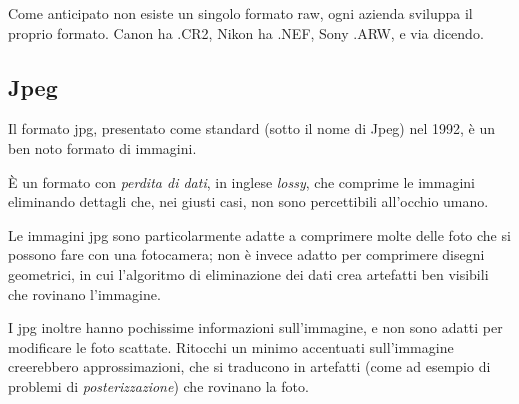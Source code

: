 Come anticipato non esiste un singolo formato raw, ogni azienda sviluppa il proprio formato. Canon ha .CR2, Nikon ha .NEF, Sony .ARW, e via dicendo.


\subsection{Jpeg} \label{subsec:jpg}
Il formato jpg, presentato come standard (sotto il nome di Jpeg) nel 1992, è un ben noto formato di immagini.

È un formato con \textit{perdita di dati}, in inglese \textit{lossy}, che comprime le immagini eliminando dettagli che, nei giusti casi, non sono percettibili all'occhio umano.

Le immagini jpg sono particolarmente adatte a comprimere molte delle foto che si possono fare con una fotocamera; non è invece adatto per comprimere disegni geometrici, in cui l'algoritmo di eliminazione dei dati crea artefatti ben visibili che rovinano l'immagine.

I jpg inoltre hanno pochissime informazioni sull'immagine, e non sono adatti per modificare le foto scattate. Ritocchi un minimo accentuati sull'immagine creerebbero approssimazioni, che si traducono in artefatti (come ad esempio di problemi di \textit{posterizzazione}) che rovinano la foto.